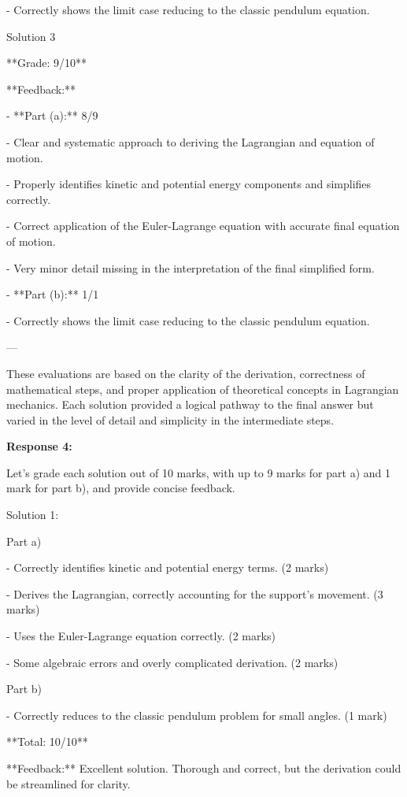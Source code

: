 \documentclass[a4paper,11pt]{article}
\begin{document}
  - Correctly shows the limit case reducing to the classic pendulum equation.

Solution 3

**Grade: 9/10**

**Feedback:**

- **Part (a):** 8/9
  
  - Clear and systematic approach to deriving the Lagrangian and equation of motion.
  
  - Properly identifies kinetic and potential energy components and simplifies correctly.
  
  - Correct application of the Euler-Lagrange equation with accurate final equation of motion.
  
  - Very minor detail missing in the interpretation of the final simplified form.

- **Part (b):** 1/1
 
  - Correctly shows the limit case reducing to the classic pendulum equation.

---

These evaluations are based on the clarity of the derivation, correctness of mathematical steps, and proper application of theoretical concepts in Lagrangian mechanics. Each solution provided a logical pathway to the final answer but varied in the level of detail and simplicity in the intermediate steps.

\bigskip
\textbf{Response 4:}

Let's grade each solution out of 10 marks, with up to 9 marks for part a) and 1 mark for part b), and provide concise feedback.

Solution 1:

Part a)

- Correctly identifies kinetic and potential energy terms. (2 marks)

- Derives the Lagrangian, correctly accounting for the support's movement. (3 marks)

- Uses the Euler-Lagrange equation correctly. (2 marks)

- Some algebraic errors and overly complicated derivation. (2 marks)
  
Part b)

- Correctly reduces to the classic pendulum problem for small angles. (1 mark)

**Total: 10/10**

**Feedback:** Excellent solution. Thorough and correct, but the derivation could be streamlined for clarity.
\end{document}
